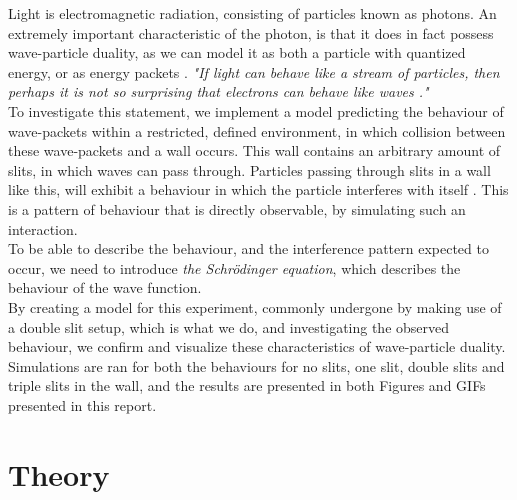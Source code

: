 \documentclass[10pt, nofootinbib, twocolumn]{revtex4-1}
\begin{document}
Light is electromagnetic radiation, consisting of particles known as photons. An extremely important characteristic of the photon, is that it does in fact possess wave-particle duality, as we can model it as both a particle with quantized energy, or as energy packets \cite{kvante}. \textit{"If light can behave like a stream of particles, then perhaps it is not so surprising that electrons can behave like waves \cite{thermal}."}\\
\newpage
To investigate this statement, we implement a model predicting the behaviour of wave-packets within a restricted, defined environment, in which collision between these wave-packets and a wall occurs. This wall contains an arbitrary amount of slits, in which waves can pass through. Particles passing through slits in a wall like this, will exhibit a behaviour in which the particle interferes with itself \cite{kvante}. This is a pattern of behaviour that is directly observable, by simulating such an interaction. \\

To be able to describe the behaviour, and the interference pattern expected to occur, we need to introduce \textit{the Schrödinger equation}, which describes the behaviour of the wave function. \\

By creating a model for this experiment, commonly undergone by making use of a double slit setup, which is what we do, and investigating the observed behaviour, we confirm and visualize these characteristics of wave-particle duality. Simulations are ran for both the behaviours for no slits, one slit, double slits and triple slits in the wall, and the results are presented in both Figures and GIFs presented in this report. 





\clearpage
\section{Theory}\label{sec:theory}
\end{document}
